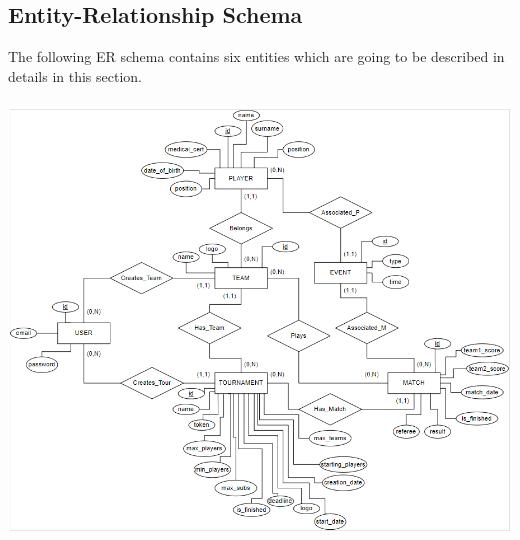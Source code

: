 \subsection{Entity-Relationship Schema}

The following ER schema contains six entities which are going to be described in details in this section.\\ \\

\includegraphics[scale = 0.50]{sections/DLL/ERSchema.png}\\
\newpage

